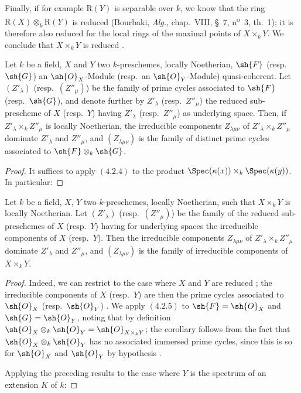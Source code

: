 Finally, if for example $\mathrm{R}(Y)$ is separable over $k$, we know that the ring $\mathrm{R}(X)\otimes_k\mathrm{R}(Y)$ is reduced (Bourbaki, \emph{Alg.}, chap.~VIII, \S~7, n\textsuperscript{o}~3, th.~1); it is therefore also reduced for the local rings of the maximal points of $X\times_k Y$.
We conclude that $X\times_k Y$ is reduced .

\begin{proposition}[4.2.5]
\label{IV.4.2.5}
Let $k$ be a field, $X$ and $Y$ two $k$-preschemes, locally Noetherian, $\sh{F}$ (resp.\ $\sh{G}$) an $\sh{O}_X$-Module (resp.\ an $\sh{O}_Y$-Module) quasi-coherent.
Let $(Z'_\lambda)$ (resp.\ $(Z''_\mu)$) be the family of prime cycles associated to $\sh{F}$ (resp.\ $\sh{G}$), and denote further by $Z'_\lambda$ (resp.\ $Z''_\mu$) the reduced sub-prescheme of $X$ (resp.\ $Y$) having $Z'_\lambda$ (resp.\ $Z''_\mu$) as underlying space.
Then, if $Z'_\lambda\times_k Z''_\mu$ is locally Noetherian, the irreducible components $Z_{\lambda\mu\nu}$ of $Z'_\lambda\times_k Z''_\mu$ dominate $Z'_\lambda$ and $Z''_\mu$, and $(Z_{\lambda\mu\nu})$ is the family of distinct prime cycles associated to $\sh{F}\otimes_k\sh{G}$.
\end{proposition}

\begin{proof}
It suffices to apply $(4.2.4)$ to the product $\Spec(\kappa(x))\times_k\Spec(\kappa(y))$.
In particular:
\end{proof}

\begin{corollary}[4.2.6]
\label{IV.4.2.6}
Let $k$ be a field, $X$, $Y$ two $k$-preschemes, locally Noetherian, such that $X\times_k Y$ is locally Noetherian.
Let $(Z'_\lambda)$ (resp.\ $(Z''_\mu)$) be the family of the reduced sub-preschemes of $X$ (resp.\ $Y$) having for underlying spaces the irreducible components of $X$ (resp.\ $Y$).
Then the irreducible components $Z_{\lambda\mu\nu}$ of $Z'_\lambda\times_k Z''_\mu$ dominate $Z'_\lambda$ and $Z''_\mu$, and $(Z_{\lambda\mu\nu})$ is the family of irreducible components of $X\times_k Y$.
\end{corollary}

\begin{proof}
Indeed, we can restrict to the case where $X$ and $Y$ are reduced ; the irreducible components of $X$ (resp.\ $Y$) are then the prime cycles associated to $\sh{O}_X$ (resp.\ $\sh{O}_Y$) .
We apply $(4.2.5)$ to $\sh{F}=\sh{O}_X$ and $\sh{G}=\sh{O}_Y$, noting that by definition $\sh{O}_X\otimes_k\sh{O}_Y=\sh{O}_{X\times_k Y}$; the corollary follows from the fact that $\sh{O}_X\otimes_k\sh{O}_Y$ has no associated immersed prime cycles, since this is so for $\sh{O}_X$ and $\sh{O}_Y$ by hypothesis .

Applying the preceding results to the case where $Y$ is the spectrum of an extension $K$ of $k$:
\end{proof}

